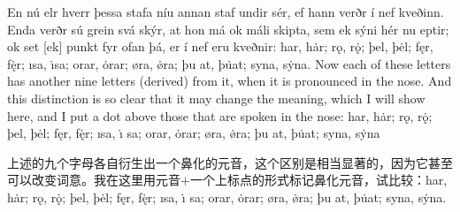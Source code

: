 \begin{paracol}{2}
    En nú elr hverr þessa stafa níu annan staf undir sér, ef hann verðr í nef kveðinn. Enda verðr sú grein svá skýr, at hon má ok máli skipta, sem ek sýni hér nu eptir; ok set [ek] punkt fyr ofan þá, er í nef eru kveðnir: har, hȧr; rǫ, rǫ̇; þel, þėl; fęr, fę̇r; ısa, ı̇sa; orar, ȯrar; øra, ø̇ra; þu at, þu̇at; syna, sẏna.
    \switchcolumn
    Now each of these letters has another nine letters (derived) from it, when it is pronounced in the nose. And this distinction is so clear that it may change the meaning, which I will show here, and I put a dot above those that are spoken in the nose: har, hȧr; rǫ, rǫ̇; þel, þėl; fęr, fę̇r; ısa, ı̇ sa; orar, ȯrar; øra, ø̇ra; þu at, þu̇at; syna, sẏna
\end{paracol}
\begin{translation*}{}
    上述的九个字母各自衍生出一个鼻化的元音，这个区别是相当显著的，因为它甚至可以改变词意。我在这里用元音+一个上标点的形式标记鼻化元音，试比较：har, hȧr; rǫ, rǫ̇; þel, þėl; fęr, fę̇r; ısa, ı̇ sa; orar, ȯrar; øra, ø̇ra; þu at, þu̇at; syna, sẏna.
\end{translation*}

